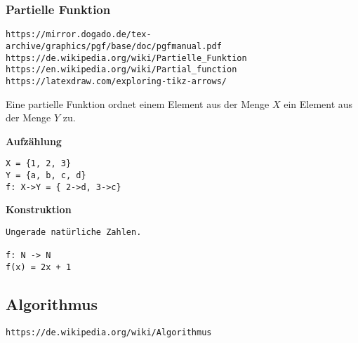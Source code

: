 \documentclass[10pt,a4paper]{article}
\begin{document}
\subsubsection {Partielle Funktion}

\verb+https://mirror.dogado.de/tex-archive/graphics/pgf/base/doc/pgfmanual.pdf+ \\
\verb+https://de.wikipedia.org/wiki/Partielle_Funktion+ \\
\verb+https://en.wikipedia.org/wiki/Partial_function+ \\
\verb+https://latexdraw.com/exploring-tikz-arrows/+
\vskip 8pt

Eine partielle Funktion ordnet einem Element aus der Menge $X$ ein
Element aus der Menge $Y$ zu.

\vskip 16pt
{\bf Aufzählung}

\vskip 16pt
\begin{verbatim}
X = {1, 2, 3}
Y = {a, b, c, d}
f: X->Y = { 2->d, 3->c}
\end{verbatim}


\vskip 16pt
{\bf Konstruktion}

\begin{verbatim}
Ungerade natürliche Zahlen.

f: N -> N
f(x) = 2x + 1
\end{verbatim}


\subsection {Algorithmus}

\verb+https://de.wikipedia.org/wiki/Algorithmus+
\vskip 8pt
\end{document}
